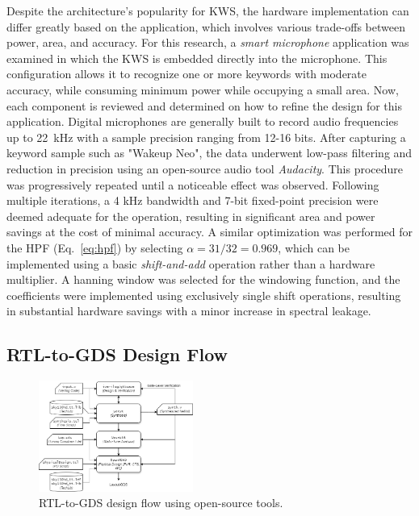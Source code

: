 Despite the architecture's popularity for KWS, the hardware implementation can differ greatly based on the application, which involves various trade-offs between power, area, and accuracy.
For this research, a \textit{smart microphone } application was examined in which the KWS is embedded directly into the microphone. This configuration allows it to recognize one or more keywords with moderate accuracy, while consuming minimum power while occupying a small area.
Now, each component is reviewed and determined on how to refine the design for this application. Digital microphones are generally built to record audio frequencies up to 22~kHz with a sample precision ranging from 12-16 bits. After capturing a keyword sample such as "Wakeup Neo", the data underwent low-pass filtering and reduction in precision using an open-source audio tool \textit{Audacity}. This procedure was progressively repeated until a noticeable effect was observed. Following multiple iterations, a 4 kHz bandwidth and 7-bit fixed-point precision were deemed adequate for the operation, resulting in significant area and power savings at the cost of minimal accuracy.
A similar optimization was performed for the HPF (Eq.~\ref{eq:hpf}) by selecting $\alpha=31/32=0.969$, which can be implemented using a basic \textit{shift-and-add} operation rather than a hardware multiplier. 
A hanning window was selected for the windowing function, and the coefficients were implemented using exclusively single shift operations, resulting in substantial hardware savings with a minor increase in spectral leakage. 

\subsection{RTL-to-GDS Design Flow}

\begin{figure}[htbp]
	\includegraphics[width=0.45\textwidth]{figs/rtl2gds-toolchain.png}
	\caption{RTL-to-GDS design flow using open-source tools.}
	\label{fig:RTL-to-GDS}
\end{figure}

